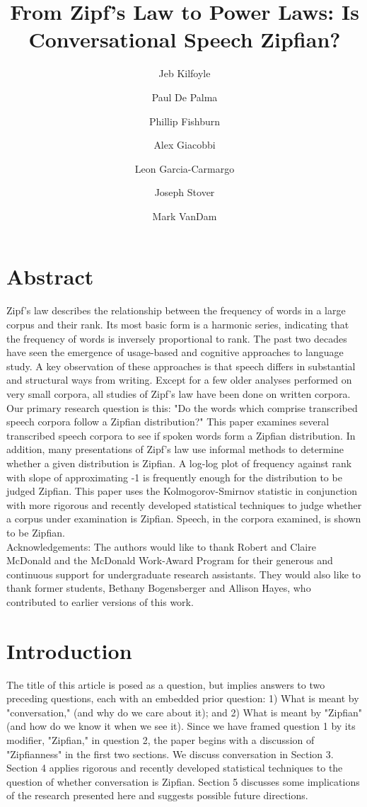 \documentclass[12pt]{article}
\title{From Zipf's Law to Power Laws: Is Conversational Speech Zipfian?}
\author[1]{Jeb Kilfoyle}
\author[2]{Paul De Palma}
\author[2]{Phillip Fishburn}
\author[2]{Alex Giacobbi}
\author[2] {Leon Garcia-Carmargo}
\author[3]{Joseph Stover}
\author[4]{Mark VanDam}
\affil[1]{Department of Computer Science, University of New Mexico}
\affil[2]{Department of Computer Science, Gonzaga University}
\affil[3]{Department of Mathematics, Gonzaga University}
\affil[4]{Department of Speech and Hearing Sciences, Washington State University}
\begin{document}
\maketitle  %
\section*{\centering\large Abstract}
\noindent Zipf's law describes the relationship between the frequency of words in a large corpus and their rank.  Its most basic form is a harmonic series, indicating that the frequency of words is inversely proportional to rank.  The past two decades have seen the emergence of usage-based and cognitive approaches to language study.  A key observation of these approaches is that speech differs in substantial and structural ways from writing.  Except for a few older analyses performed on very small corpora, all studies of Zipf's law have been done on written corpora.  Our primary research question is this: "Do the words which comprise transcribed speech corpora follow a Zipfian distribution?"  This paper examines several transcribed speech corpora to see if spoken words form a Zipfian distribution.  In addition, many presentations of Zipf's law use informal methods to determine whether a given distribution is Zipfian.  A log-log plot of frequency against rank with slope of approximating -1 is frequently enough for the distribution to be judged Zipfian.  This paper uses the Kolmogorov-Smirnov statistic in conjunction with more rigorous and recently developed statistical techniques to judge whether a corpus under examination is Zipfian. Speech, in the corpora examined, is shown to be Zipfian.\\

\noindent Acknowledgements: The authors would like to thank Robert and Claire McDonald and the McDonald Work-Award Program for their generous and continuous support for undergraduate research assistants.  They would also like to thank former students, Bethany Bogensberger and Allison Hayes, who contributed to earlier versions of this work. 

\section{Introduction}

The title of this article is posed as a question, but implies answers to two preceding questions, each with an embedded prior question: 1) What is meant by "conversation," (and why do we care about it); and 2) What is meant by "Zipfian" (and how do we know it when we see it).  Since we have framed question 1 by its modifier, "Zipfian,"  in question 2, the paper begins with a discussion of "Zipfianness" in the first two sections.   We discuss conversation in Section 3.  Section 4 applies rigorous and recently developed statistical techniques to the question of whether conversation is Zipfian.  Section 5 discusses some implications of the research presented here and suggests possible future directions.  
\end{document}
